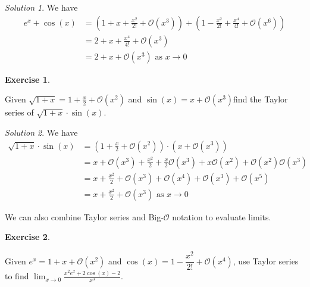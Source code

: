\documentclass[
]{book}
\theoremstyle{definition}
\theoremstyle{definition}
\theoremstyle{definition}
\newtheorem{exercise}{Exercise}[chapter]
\theoremstyle{definition}
\theoremstyle{remark}
\newtheorem*{solution}{Solution}
\begin{document}
\begin{solution}

We have
\begin{align*}
e^x+\cos(x) &= \left ( 1+x+\frac{x^2}{2!}+\mathcal{O}(x^3)\right)+ \left ( 1-\frac{x^2}{2!}+\frac{x^4}{4!}+\mathcal{O}(x^6)\right )\\
& = 2 +x +\frac{x^4}{4!} +\mathcal{O}(x^3)\\
&= 2+x+\mathcal{O}(x^3) \mbox{ as  } x\to 0
\end{align*}

\end{solution}

\begin{exercise}
\protect\hypertarget{exr:unlabeled-div-259}{}\label{exr:unlabeled-div-259}

Given \(\sqrt{1+x}=1+\frac{x}{2}+\mathcal{O}(x^2)\) and \(\sin(x)=x+\mathcal{O}(x^3)\)find the Taylor series of \(\sqrt{1+x}\cdot \sin(x)\).

\end{exercise}

\begin{solution}

We have
\begin{align*}
\sqrt{1+x}\cdot \sin(x) &= \left ( 1+\frac{x}{2}+\mathcal{O}(x^2)\right)\cdot \left ( x+\mathcal{O}(x^3)\right )\\
& = x+\mathcal{O}(x^3)+\frac{x^2}{2}+\frac{x}{2}\mathcal{O}(x^3)+x\mathcal{O}(x^2)+\mathcal{O}(x^2)\mathcal{O}(x^3)\\
&= x+\frac{x^2}{2}+\mathcal{O}(x^3)+\mathcal{O}(x^4)+\mathcal{O}(x^3)+\mathcal{O}(x^5)\\
&= x+\frac{x^2}{2} +\mathcal{O}(x^3) \mbox{ as }  x\to 0
 \end{align*}

\end{solution}

We can also combine Taylor series and Big-\(\mathcal{O}\) notation to evaluate limits.

\begin{exercise}
\protect\hypertarget{exr:unlabeled-div-261}{}\label{exr:unlabeled-div-261}

Given \(e^x = 1+x+\mathcal{O}(x^2)\) and \(\cos(x)=1-\dfrac{x^2}{2!}+\mathcal{O}(x^4)\), use Taylor series to find \(\displaystyle \lim_{x\to 0}\frac{x^2e^x+2\cos(x)-2}{x^3}\).

\end{exercise}
\end{document}
